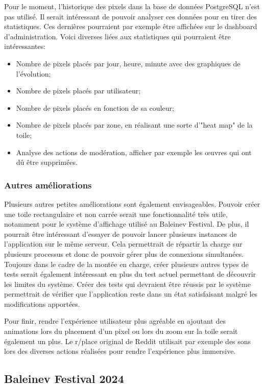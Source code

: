 Pour le moment, l'historique des pixels dans la base de données PostgreSQL n'est pas utilisé. Il serait intéressant de pouvoir analyser ces données pour en tirer des statistiques. Ces dernières pourraient par exemple être affichées sur le dashboard d'administration. Voici diverses liées aux statistiques qui pourraient être intéressantes:

\begin{itemize}
  \item Nombre de pixels placés par jour, heure, minute avec des graphiques de l'évolution;
  \item Nombre de pixels placés par utilisateur;
  \item Nombre de pixels placés en fonction de sa couleur;
  \item Nombre de pixels placés par zone, en réalisant une sorte d'"heat map" de la toile;
  \item Analyse des actions de modération, afficher par exemple les \oe{}uvres qui ont dû être supprimées.
\end{itemize}

\subsubsection{Autres améliorations}

Plusieurs autres petites améliorations sont également envisageables. Pouvoir créer une toile rectangulaire et non carrée serait une fonctionnalité très utile, notamment pour le système d'affichage utilisé au Baleinev Festival. De plus, il pourrait être intéressant d'essayer de pouvoir lancer plusieurs instances de l'application sur le même serveur. Cela permettrait de répartir la charge sur plusieurs processus et donc de pouvoir gérer plus de connexions simultanées. Toujours dans le cadre de la montée en charge, créer plusieurs autres types de tests serait également intéressant en plus du test actuel permettant de découvrir les limites du système. Créer des tests qui devraient être réussis par le système permettrait de vérifier que l'application reste dans un état satisfaisant malgré les modifications apportées.

Pour finir, rendre l'expérience utilisateur plus agréable en ajoutant des animations lors du placement d'un pixel ou lors du zoom sur la toile serait également un plus. Le r/place original de Reddit utilisait par exemple des sons lors des diverses actions réalisées pour rendre l'expérience plus immersive.

\subsection{Baleinev Festival 2024}

